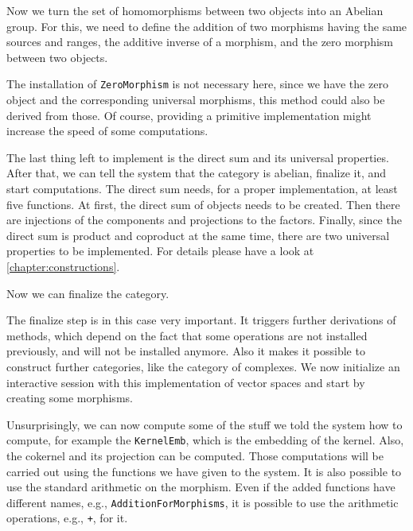 

Now we turn the set of homomorphisms between two objects into an Abelian group. For this, we need to define the addition of
two morphisms having the same sources and ranges, the additive inverse of a morphism, and the zero morphism between two objects.



The installation of \texttt{ZeroMorphism} is not necessary here, since we have the zero object and the corresponding
universal morphisms, this method could also be derived from those. Of course, providing a primitive implementation might
increase the speed of some computations.

The last thing left to implement is the direct sum and its universal properties. After that, we can tell the system that the
category is abelian, finalize it, and start computations. The direct sum needs, for a proper implementation, at least five
functions. At first, the direct sum of objects needs to be created. Then there are injections of the components and projections
to the factors. Finally, since the direct sum is product and coproduct at the same time, there are two universal properties to be implemented.
For details please have a look at \ref{chapter:constructions}.



Now we can finalize the category.



The finalize step is in this case very important. It triggers further derivations of methods, which depend on the fact that
some operations are not installed previously, and will not be installed anymore. Also it makes it possible to construct further
categories, like the category of complexes. We now initialize an interactive session with this implementation of vector spaces
and start by creating some morphisms.

\begin{small}

\end{small}

Unsurprisingly, we can now compute some of the stuff we told the system how to compute, for example the \texttt{KernelEmb},
which is the embedding of the kernel. Also, the cokernel and its projection can be computed. Those computations will
be carried out using the functions we have given to the system. It is also possible to use the standard arithmetic on the morphism.
Even if the added functions have different names, e.g., \texttt{AdditionForMorphisms}, it is possible to use the \GAP arithmetic
operations, e.g., \texttt{+}, for it.

